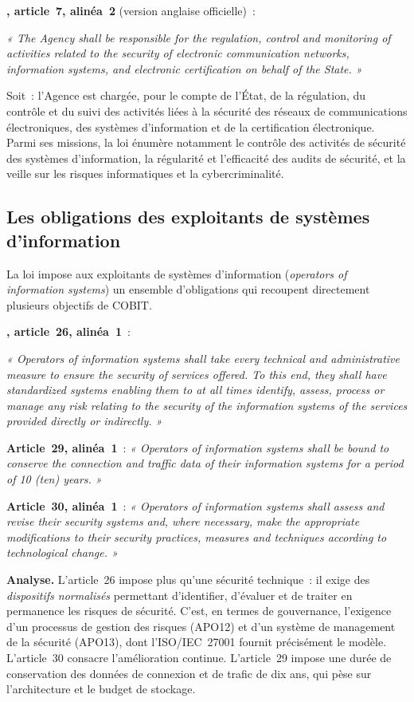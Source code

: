 \begin{boxjuris}
\textbf{, article~7, alinéa~2} (version anglaise
officielle)~:

\medskip
\textit{« The Agency \textelp{} shall be responsible for the regulation,
control and monitoring of activities related to the security of
electronic communication networks, information systems, and electronic
certification on behalf of the State. »}

\medskip
Soit~: l'Agence est chargée, pour le compte de l'État, de la régulation,
du contrôle et du suivi des activités liées à la sécurité des réseaux de
communications électroniques, des systèmes d'information et de la
certification électronique. Parmi ses missions, la loi énumère notamment
le contrôle des activités de sécurité des systèmes d'information,
la régularité et l'efficacité des audits de sécurité, et la veille sur
les risques informatiques et la cybercriminalité.
\end{boxjuris}

\subsection{Les obligations des exploitants de systèmes d'information}

La loi impose aux exploitants de systèmes d'information
(\textit{operators of information systems}) un ensemble d'obligations qui
recoupent directement plusieurs objectifs de COBIT.

\begin{boxjuris}
\textbf{, article~26, alinéa~1}~:

\medskip
\textit{« Operators of information systems shall take every technical and
administrative measure to ensure the security of services offered. To
this end, they shall have standardized systems enabling them to at all
times identify, assess, process or manage any risk relating to the
security of the information systems of the services provided directly or
indirectly. »}

\medskip
\textbf{Article~29, alinéa~1}~: \textit{« Operators of information systems
shall be bound to conserve the connection and traffic data of their
information systems for a period of 10 (ten) years. »}

\medskip
\textbf{Article~30, alinéa~1}~: \textit{« Operators of information systems
shall assess and revise their security systems and, where necessary, make
the appropriate modifications to their security practices, measures and
techniques according to technological change. »}

\medskip
\textbf{Analyse.} L'article~26 impose plus qu'une sécurité technique~: il
exige des \emph{dispositifs normalisés} permettant d'identifier, d'évaluer
et de traiter en permanence les risques de sécurité. C'est, en termes de
gouvernance, l'exigence d'un processus de gestion des risques (APO12) et
d'un système de management de la sécurité (APO13), dont l'ISO/IEC~27001
fournit précisément le modèle. L'article~30 consacre l'amélioration
continue. L'article~29 impose une durée de conservation des données de
connexion et de trafic de dix ans, qui pèse sur l'architecture et le
budget de stockage.
\end{boxjuris}

